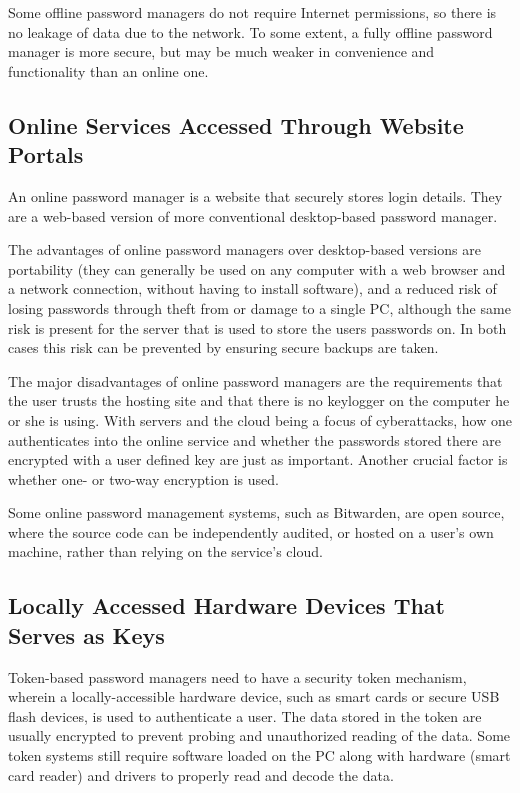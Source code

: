 Some offline password managers do not require Internet permissions, so there is no leakage of data due to the network. To some extent, a fully offline password manager is more secure, but may be much weaker in convenience and functionality than an online one.


\subsection{Online Services Accessed Through Website Portals}

An online password manager is a website that securely stores login details. They are a web-based version of more conventional desktop-based password manager.

The advantages of online password managers over desktop-based versions are portability (they can generally be used on any computer with a web browser and a network connection, without having to install software), and a reduced risk of losing passwords through theft from or damage to a single PC, although the same risk is present for the server that is used to store the users passwords on. In both cases this risk can be prevented by ensuring secure backups are taken.

The major disadvantages of online password managers are the requirements that the user trusts the hosting site and that there is no keylogger on the computer he or she is using. With servers and the cloud being a focus of cyberattacks, how one authenticates into the online service and whether the passwords stored there are encrypted with a user defined key are just as important. Another crucial factor is whether one- or two-way encryption is used.

Some online password management systems, such as Bitwarden, are open source, where the source code can be independently audited, or hosted on a user's own machine, rather than relying on the service's cloud.

\subsection{Locally Accessed Hardware Devices That Serves as Keys}

Token-based password managers need to have a security token mechanism, wherein a locally-accessible hardware device, such as smart cards or secure USB flash devices, is used to authenticate a user. The data stored in the token are usually encrypted to prevent probing and unauthorized reading of the data. Some token systems still require software loaded on the PC along with hardware (smart card reader) and drivers to properly read and decode the data.

